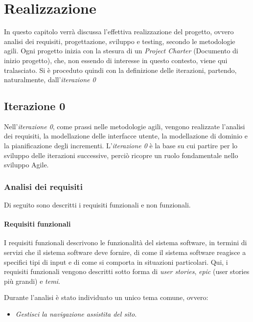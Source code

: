 
\chapter{Realizzazione}
\label{ref:realizzazione}

In questo capitolo verrà discussa l'effettiva realizzazione del progetto, ovvero analisi dei requisiti, progettazione, sviluppo e testing, secondo le metodologie agili.
Ogni progetto inizia con la stesura di un \textit{Project Charter} (Documento di inizio progetto), che, non essendo di interesse in questo contesto, viene qui tralasciato.
Si è proceduto quindi con la definizione delle iterazioni, partendo, naturalmente, dall'\textit{iterazione 0}

\section{Iterazione 0}

Nell'\emph{iterazione 0}, come prassi nelle metodologie agili, vengono realizzate l'analisi dei requisiti, la modellazione delle interfacce utente, la modellazione di dominio e la pianificazione degli incrementi.
L'\emph{iterazione 0} è la base su cui partire per lo sviluppo delle iterazioni successive, perciò ricopre un ruolo fondamentale nello sviluppo Agile.

\subsection{Analisi dei requisiti}
Di seguito sono descritti i requisiti funzionali e non funzionali.

\subsubsection{Requisiti funzionali}
I requisiti funzionali descrivono le funzionalità del sistema software, in termini di servizi che il sistema software deve fornire, di come il sistema software reagisce a specifici tipi di input e di come si comporta in situazioni particolari.
Qui, i requisiti funzionali vengono descritti sotto forma di \textit{user stories}, \textit{epic} (user stories più grandi) e \textit{temi}.

Durante l'analisi è stato individuato un unico tema comune, ovvero:
\begin{itemize}
\item \textit{Gestisci la navigazione assistita del sito}.
\end{itemize}

